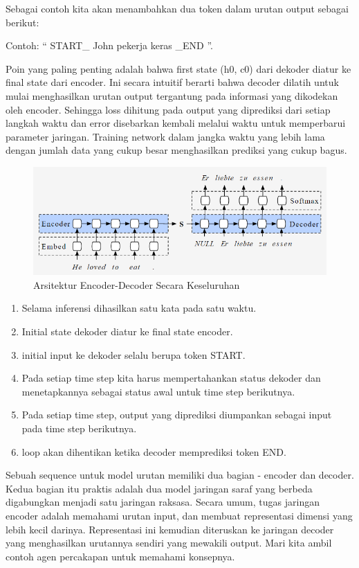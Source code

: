 Sebagai contoh kita akan menambahkan dua token dalam urutan output sebagai berikut:

Contoh:
“ START\_ John pekerja keras \_END ”.

Poin yang paling penting adalah bahwa first state (h0, c0) dari dekoder diatur ke final state dari encoder. Ini secara intuitif berarti bahwa decoder dilatih untuk mulai menghasilkan urutan output tergantung pada informasi yang dikodekan oleh encoder. Sehingga loss dihitung pada output yang diprediksi dari setiap langkah waktu dan error disebarkan kembali melalui waktu untuk memperbarui parameter jaringan. Training network dalam jangka waktu yang lebih lama dengan jumlah data yang cukup besar menghasilkan prediksi yang cukup bagus.

\begin{figure}[H]
        \centerline{\includegraphics[scale=.45]{figures/arsitektur-encoder-decoder}}
        \caption{Arsitektur Encoder-Decoder Secara Keseluruhan}
		\label{endecoder}
\end{figure}

\begin{enumerate}
\item Selama inferensi dihasilkan satu kata pada satu waktu.
\item Initial state dekoder diatur ke final state encoder.
\item initial input ke dekoder selalu berupa token START.
\item Pada setiap time step kita harus mempertahankan status dekoder dan menetapkannya sebagai status awal untuk time step berikutnya.
\item Pada setiap time step, output yang diprediksi diumpankan sebagai input pada time step berikutnya.
\item loop akan dihentikan ketika decoder memprediksi token END.
\end{enumerate}

Sebuah sequence untuk model urutan memiliki dua bagian - encoder dan decoder.  Kedua bagian itu praktis adalah dua model jaringan saraf yang berbeda digabungkan menjadi satu jaringan raksasa. Secara umum, tugas jaringan encoder adalah memahami urutan input, dan membuat representasi dimensi yang lebih kecil darinya. Representasi ini kemudian diteruskan ke jaringan decoder yang menghasilkan urutannya sendiri yang mewakili output. Mari kita ambil contoh agen percakapan untuk memahami konsepnya.

